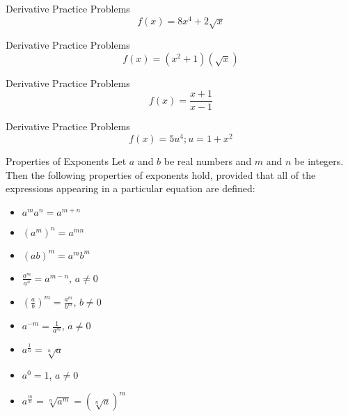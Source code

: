 \documentclass[aspectratio=169]{beamer}
\begin{document}
\begin{frame}{Derivative Practice Problems}\label{main1}
	\vspace{-4cm}
    \[
    f(x) = 8x^{4} + 2 \sqrt{x}
    \]
\end{frame}

\begin{frame}{Derivative Practice Problems}\label{main1}
    \vspace{-4cm}
    \[
    f(x) = (x^2 + 1)(\sqrt{x})
    \]
\end{frame}

\begin{frame}{Derivative Practice Problems}\label{main1}
	\vspace{-4cm}
    \[
    f(x) = \frac{x + 1}{x - 1}
    \]
\end{frame}

\begin{frame}{Derivative Practice Problems}\label{main1}
	\vspace{-4cm}
    \[
    f(x) = 5u^{4} ; u = 1 + x^{2}
    \]
\end{frame}

\begin{frame}{Properties of Exponents}\label{main1}
Let $a$ and $b$ be real numbers and $m$ and $n$ be integers. Then the following properties of exponents hold, provided that all of the expressions appearing in a particular equation are defined:
\begin{itemize}
\begin{itemize}
    \item $a^m a^n = a^{m+n}$
    \item $(a^m)^n = a^{mn}$
    \item $(ab)^m = a^m b^m$
    \item $\frac{a^m}{a^n} = a^{m-n}$, $a \neq 0$
    \item $\left(\frac{a}{b}\right)^m = \frac{a^m}{b^m}$, $b \neq 0$
    \item $a^{-m} = \frac{1}{a^m}$, $a \neq 0$
    \item $a^{\frac{1}{n}} = \sqrt[n]{a}$
    \item $a^0 = 1$, $a \neq 0$
    \item $a^{\frac{m}{n}} = \sqrt[n]{a^m} = \left(\sqrt[n]{a}\right)^m$
\end{itemize}
\end{itemize}
\end{frame}
\end{document}
